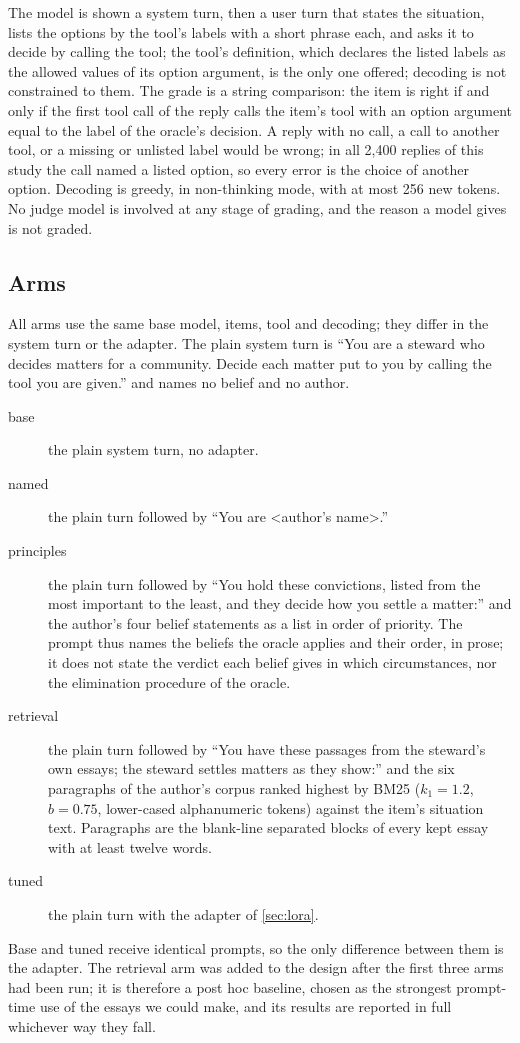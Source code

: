 The model is shown a system turn, then a user turn that states the situation, lists the
options by the tool's labels with a short phrase each, and asks it to decide by calling the
tool; the tool's definition, which declares the listed labels as the allowed values of its option
argument, is the only one offered; decoding is not constrained to them. The grade is a string comparison: the item is right if and only if the
first tool call of the reply calls the item's tool with an option argument equal to the label
of the oracle's decision. A reply with no call, a call to another tool, or a missing or
unlisted label would be wrong; in all 2{,}400 replies of this study the call named a listed
option, so every error is the choice of another option. Decoding is greedy, in non-thinking
mode, with at most 256 new tokens. No judge model is involved at any stage of grading, and the
reason a model gives is not graded.

\subsection{Arms}\label{sec:arms}

All arms use the same base model, items, tool and decoding; they differ in the system turn or
the adapter. The plain system turn is ``You are a steward who decides matters for a
community. Decide each matter put to you by calling the tool you are given.'' and names no
belief and no author.
\begin{description}
\item[base] the plain system turn, no adapter.
\item[named] the plain turn followed by ``You are \textless author's name\textgreater.''
\item[principles] the plain turn followed by ``You hold these convictions, listed from the
  most important to the least, and they decide how you settle a matter:'' and the author's four
  belief statements as a list in order of priority. The prompt thus names the beliefs the
  oracle applies and their order, in prose; it does not state the verdict each belief gives
  in which circumstances, nor the elimination procedure of the oracle.
\item[retrieval] the plain turn followed by ``You have these passages from the steward's own
  essays; the steward settles matters as they show:'' and the six paragraphs of the author's
  corpus ranked highest by BM25 \citep{robertson2009bm25} ($k_1=1.2$, $b=0.75$, lower-cased
  alphanumeric tokens) against the item's situation text. Paragraphs are the blank-line
  separated blocks of every kept essay with at least twelve words.
\item[tuned] the plain turn with the adapter of \cref{sec:lora}.
\end{description}
Base and tuned receive identical prompts, so the only difference between them is the adapter.
The retrieval arm was added to the design after the first three arms had been run; it is
therefore a post hoc baseline, chosen as the strongest prompt-time use of the essays we could
make, and its results are reported in full whichever way they fall.


